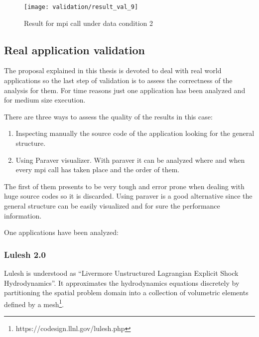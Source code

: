 \begin{figure}[H]
    \centering
    \texttt{[image: validation/result\_val\_9]}
    \caption{Result for mpi call under data condition 2}
    \label{fig:result_val_9}
\end{figure}

\subsection{Real application validation}

The proposal explained in this thesis is devoted to deal with real world
applications so the last step of validation is to assess the correctness of the
analysis for them. For time reasons just one application has been analyzed and
for medium size execution.

There are three ways to assess the quality of the results in this case:
\begin{enumerate}[label=\roman*)]
  \item Inspecting manually the source code of the application looking for the
    general structure. 
  \item Using Paraver visualizer. With paraver it can be analyzed where and when
    every mpi call has taken place and the order of them. 
\end{enumerate}

The first of them presents to be very tough and error prone when dealing with
huge source codes so it is discarded. Using paraver is a good alternative since
the general structure can be easily visualized and for sure the performance
information. 

One applications have been analyzed:

\subsubsection{Lulesh 2.0}

Lulesh is understood as ``Livermore Unstructured Lagrangian Explicit
Shock Hydrodynamics''. It approximates the hydrodynamics equations discretely 
by partitioning the spatial problem domain into a collection of volumetric 
elements defined by a mesh\footnote{https://codesign.llnl.gov/lulesh.php}.

